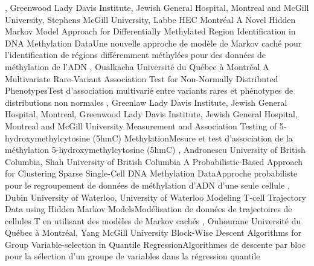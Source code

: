 {
,  {Greenwood}
{Lady Davis Institute, Jewish General Hospital, Montreal and McGill University},  {Stephens}
{McGill University},  {Labbe}
{HEC Montréal}
}
{A Novel Hidden Markov Model Approach for Differentially Methylated Region Identification in DNA Methylation Data}{Une nouvelle approche de modèle de Markov caché pour l’identification de régions différemment méthylées pour des données de méthylation de l’ADN}
{\bubbleE \enspace \screenE}
{
,  {Oualkacha}
{Université du Québec à Montréal}
}
{A Multivariate Rare-Variant Association Test for Non-Normally Distributed Phenotypes}{Test d'association multivarié entre variants rares et phénotypes de distributions non normales}
{\bubbleE \enspace \screenE}
{
,  {Greenlaw}
{Lady Davis Institute, Jewish General Hospital, Montreal},  {Greenwood}
{Lady Davis Institute, Jewish General Hospital, Montreal and McGill University}
}
{Measurement and Association Testing of 5-hydroxymethylcytosine (5hmC) Methylation}{Mesure et test d’association de la méthylation 5-hydroxymethylcytosine (5hmC)}
{\bubbleE \enspace \screenE}
{
,  {Andronescu}
{University of British Columbia},  {Shah}
{University of British Columbia}
}
{A Probabilistic-Based Approach for Clustering Sparse Single-Cell DNA Methylation Data}{Approche probabiliste pour le regroupement de données de méthylation d’ADN d'une seule cellule}
{\bubbleE \enspace \screenE}
{
,  {Dubin}
{University of Waterloo}, 
{University of Waterloo}
}
{Modeling T-cell Trajectory Data using Hidden Markov Models}{Modélisation de données de trajectoires de cellules T en utilisant des modèles de Markov cachés}
{\bubbleE \enspace \screenE}
{
,  {Ouhourane}
{Université du Québec à Montréal},  {Yang}
{McGill University}
}
{Block-Wise Descent Algorithms for Group Variable-selection in Quantile Regression}{Algorithmes de descente par bloc pour la sélection d’un groupe de variables dans la régression quantile}
{\bubbleE \enspace \screenE}

